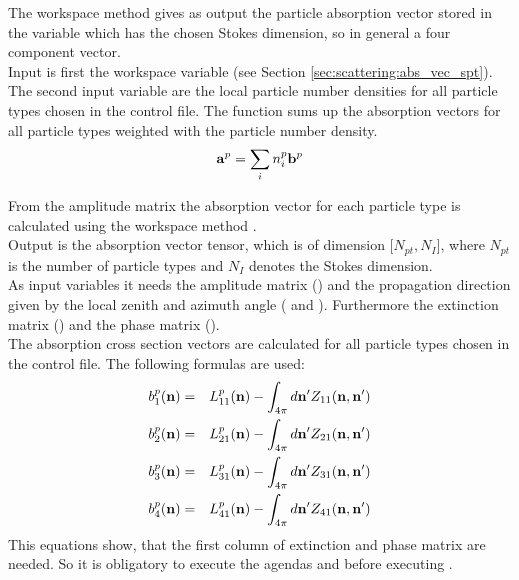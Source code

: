 \label{sec:scattering:abs_vec_part}

The workspace method  gives as output the
particle absorption vector  stored in the variable
 which has the chosen Stokes dimension, so in
general a four component vector.\\
Input is first the workspace variable  (see Section
\ref{sec:scattering:abs_vec_spt}). The second input variable are the
local particle number densities  for all particle types
chosen in the control file.
The function sums up the absorption vectors for all particle types
weighted with the particle number density.
\begin{eqnarray}
  {\bf a}^{p} = \sum_i n^p_i {\bf b}^{p}
\end{eqnarray}


\label{sec:scattering:abs_vec_gas}


\label{sec:scattering:abs_vec_spt}

From the amplitude matrix the absorption vector for each
particle type is calculated using the workspace method
.\\
Output is the absorption vector tensor, which is  of  dimension
[$N_{pt}, N_{I}$], where $N_{pt}$ is the number of particle
types  and $N_{I}$ denotes the Stokes dimension.\\
As input variables it needs the amplitude matrix ()
and the propagation direction given by the local zenith and azimuth
angle ( and ). Furthermore the extinction
matrix () and the phase matrix
().\\
The absorption cross section vectors \SAbVec{} are
calculated for all particle types chosen in the control
file. The following formulas are used:
\begin{eqnarray}
  \label{eq:gen_abs_vector}
  b^p_1({\bf n}) &=&  L^p_{11}({\bf n}) - \int_{4\pi} d{\bf n'}
  Z_{11}({\bf n, n'})\\
  b^p_2({\bf n}) &=&  L^p_{21}({\bf n}) - \int_{4\pi} d{\bf n'}
  Z_{21}({\bf n, n'})\\
  b^p_3({\bf n}) &=&  L^p_{31}({\bf n}) - \int_{4\pi} d{\bf n'}
  Z_{31}({\bf n, n'})\\
  b^p_4({\bf n}) &=&  L^p_{41}({\bf n}) - \int_{4\pi} d{\bf n'}
  Z_{41}({\bf n, n'})
\end{eqnarray}
This equations show, that the first column of extinction and phase
matrix are needed. So it is obligatory to execute the agendas
 and 
 before executing
. 




